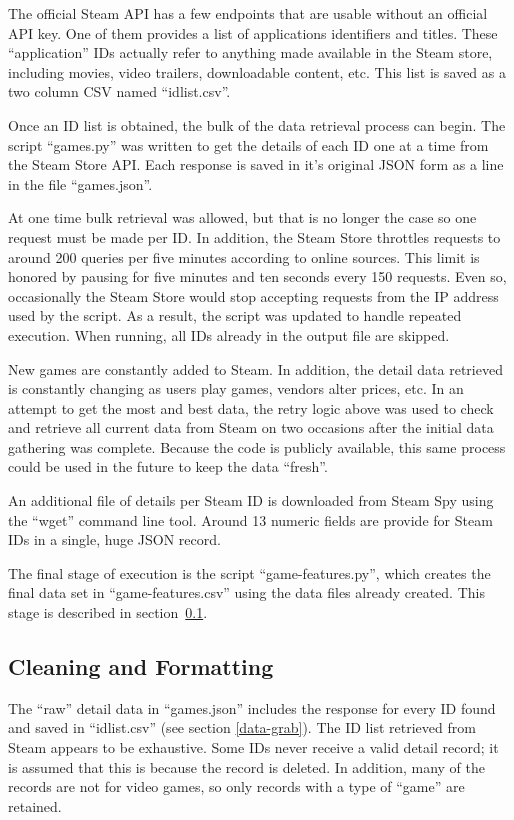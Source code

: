\documentclass[10pt,journal,compsoc]{IEEEtran}
\begin{document}
The official Steam API has a few endpoints that are usable without an official
API key. One of them provides a list of applications identifiers and titles. These
``application'' IDs actually refer to anything made available in the Steam
store, including movies, video trailers, downloadable content, etc. This list
is saved as a two column CSV named ``idlist.csv''.

Once an ID list is obtained, the bulk of the data retrieval process can begin.
The script ``games.py'' was written to get the details of each ID one at a
time from the Steam Store API. Each response is saved in it's original JSON
form as a line in the file ``games.json''.

At one time bulk retrieval was allowed, but that is no longer the case so one
request must be made per ID. In addition, the Steam Store throttles requests
to around 200 queries per five minutes according to online sources. This limit
is honored by pausing for five minutes and ten seconds every 150 requests.
Even so, occasionally the Steam Store would stop accepting requests from the
IP address used by the script. As a result, the script was updated to handle
repeated execution. When running, all IDs already in the output file are
skipped.

New games are constantly added to Steam. In addition, the detail data
retrieved is constantly changing as users play games, vendors alter prices,
etc. In an attempt to get the most and best data, the retry logic above was
used to check and retrieve all current data from Steam on two occasions after
the initial data gathering was complete. Because the code is publicly
available, this same process could be used in the future to keep the data
``fresh''.

An additional file of details per Steam ID is downloaded from Steam Spy using
the ``wget'' command line tool. Around 13 numeric fields are provide for Steam
IDs in a single, huge JSON record.

The final stage of execution is the script ``game-features.py'', which creates
the final data set in ``game-features.csv'' using the data files already
created. This stage is described in section~\ref{data-clean}.

\subsection{Cleaning and Formatting}

\label{data-clean}

The ``raw'' detail data in ``games.json'' includes the response for every ID
found and saved in ``idlist.csv'' (see section \ref{data-grab}). The ID list
retrieved from Steam appears to be exhaustive. Some IDs never receive a
valid detail record; it is assumed that this is because the record is deleted.
In addition, many of the records are not for video games, so only records with
a type of ``game'' are retained.
\end{document}
